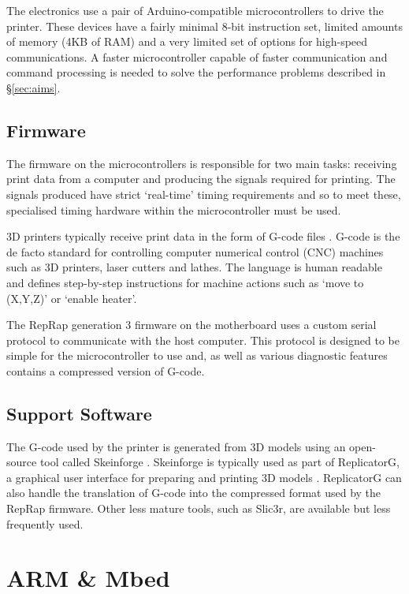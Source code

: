 			The electronics use a pair of Arduino-compatible microcontrollers to drive
			the printer. These devices have a fairly minimal 8-bit instruction set,
			limited amounts of memory (4KB of RAM) and a very limited set of options
			for high-speed communications. A faster microcontroller capable of faster
			communication and command processing is needed to solve the performance
			problems described in \S\ref{sec:aims}.
		
		\subsection{Firmware}
			
			The firmware on the microcontrollers is responsible for two main tasks:
			receiving print data from a computer and producing the signals required
			for printing. The signals produced have strict `real-time' timing
			requirements and so to meet these, specialised timing hardware within the
			microcontroller must be used.
			
			3D printers typically receive print data in the form of G-code files
			\cite{reprapgcode}. G-code is the de facto standard for controlling
			computer numerical control (CNC) machines such as 3D printers, laser
			cutters and lathes. The language is human readable and defines
			step-by-step instructions for machine actions such as `move to (X,Y,Z)' or
			`enable heater'.
			
			The RepRap generation 3 firmware on the motherboard uses a custom serial
			protocol to communicate with the host computer. This protocol is designed
			to be simple for the microcontroller to use and, as well as various
			diagnostic features contains a compressed version of G-code.
		
		\subsection{Support Software}
			
			The G-code used by the printer is generated from 3D models using an
			open-source tool called Skeinforge \cite{skeinforge}. Skeinforge is
			typically used as part of ReplicatorG, a graphical user interface for
			preparing and printing 3D models \cite{replicatorg}. ReplicatorG can also
			handle the translation of G-code into the compressed format used by the
			RepRap firmware.  Other less mature tools, such as Slic3r, are available
			but less frequently used.
		
	\section{ARM \& Mbed}
		
